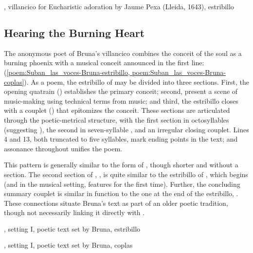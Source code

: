 {, villancico for Eucharistic adoration by Jaume Pexa
(Lleida, 1643), estribillo}


\subsection{Hearing the Burning Heart}

The anonymous poet of Bruna's villancico combines the conceit of the soul as a
burning phoenix with a musical conceit announced in the first line:  (\cref{poem:Suban_las_voces-Bruna-estribillo,
poem:Suban_las_voces-Bruna-coplas}).
As a poem, the estribillo of  may be divided into three
sections. 
First, the opening quatrain () establishes the primary conceit;
second,  present a scene of music-making using technical terms
from music; and third, the estribillo closes with a couplet
() that epitomizes the conceit.
These sections are articulated through the poetic-metrical structure, with the
first section in octosyllables (suggesting ), the second in
seven-syllable , and an irregular closing couplet.
Lines 4 and 13, both truncated to five syllables, mark ending points in the
text; and assonance throughout unifies the poem.

This pattern is generally similar to the form of , though shorter and without a  section.  
The second section of , , is quite similar to the estribillo of , which begins
 (and in the musical
setting, features  for the first time).
Further, the concluding summary couplet is similar in function to the one at
the end of the  estribillo, .
These connections situate Bruna's text as part of an older poetic tradition,
though not necessarily linking it directly with .

{, setting I, poetic text set by Bruna,
estribillo}

{, setting I, poetic text set by Bruna, coplas}

